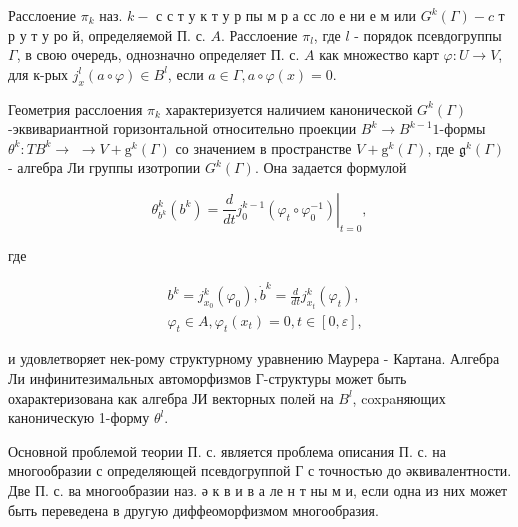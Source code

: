 \documentclass[10pt]{article}
\begin{document}
Расслоение $\pi_{k}$ наз. $k-$ с с т у к т у р пы м р а сс ло е ни е м или $G^{k}(\Gamma)-c$ т р у т у ро й, определяемой П. с. $A$. Расслоение $\pi_{l}$, где $l$ - порядок псевдогруппы $\Gamma$, в свою очередь, однозначно определяет П. с. $A$ как множество карт $\varphi: U \rightarrow V$, для к-рых $j_{x}^{l}(a \circ \varphi) \in B^{l}$, если $a \in \Gamma, a \circ \varphi(x)=0$.



Геометрия расслоения $\pi_{k}$ характеризуется наличием канонической $G^{k}(\Gamma)$-эквивариантной горизонтальной относительно проекции $B^{k} \rightarrow B^{k-1} 1$-формы $\theta^{k}: T B^{k} \rightarrow$ $\rightarrow V+\mathrm{g}^{k}(\Gamma)$ со значением в пространстве $V+\mathrm{g}^{k}(\Gamma)$, где $\mathfrak{g}^{k}(\Gamma)$ - алгебра Ли группы изотропии $G^{k}(\Gamma)$. Она задается формулой



\[

\theta_{b^{k}}^{k}\left(b^{k}\right)=\left.\frac{d}{d t} j_{0}^{k-1}\left(\varphi_{t} \circ \varphi_{0}^{-1}\right)\right|_{t=0},

\]



где



\[

\begin{aligned}

& b^{k}=j_{x_{0}}^{k}\left(\varphi_{0}\right), \dot{b}^{k}=\frac{d}{d t} j_{x_{t}}^{k}\left(\varphi_{t}\right), \\

& \varphi_{t} \in A, \varphi_{t}\left(x_{t}\right)=0, t \in[0, \varepsilon],

\end{aligned}

\]



и удовлетворяет нек-рому структурному уравнению Маурера - Картана. Алгебра Ли инфинитезимальных автоморфизмов Г-структуры может быть охарактеризована как алгебра ЈИ векторных полей на $B^{l}$, coxpaняющих каноническую 1-форму $\theta^{l}$.



Основной проблемой теории П. с. является проблема описания П. с. на многообразии с определяющей псевдогруппой Г с точностью до әквивалентности. Две П. с. ва многообразии наз. ә к в и в а ле н т ны м и, если одна из них может быть переведена в другую диффеоморфизмом многообразия.
\end{document}
